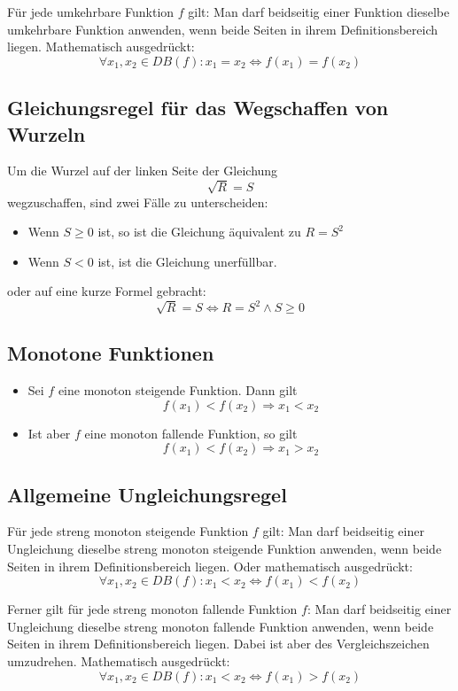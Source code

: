 \documentclass[10pt,a4paper]{article}
\begin{document}
Für jede umkehrbare Funktion $f$ gilt: Man darf beidseitig einer Funktion dieselbe umkehrbare Funktion anwenden, wenn beide Seiten in ihrem Definitionsbereich liegen. Mathematisch ausgedrückt:
$$\forall x_1, x_2 \in DB(f): x_1 = x_2 \Leftrightarrow f(x_1) = f(x_2)$$


\subsection{Gleichungsregel für das Wegschaffen von Wurzeln}

Um die Wurzel auf der linken Seite der Gleichung
$$\sqrt{R} = S$$
wegzuschaffen, sind zwei Fälle zu unterscheiden:

\begin{itemize}
\item Wenn $S \geq 0$ ist, so ist die Gleichung äquivalent zu $R = S^2$
\item Wenn $S < 0$ ist, ist die Gleichung unerfüllbar.
\end{itemize}

oder auf eine kurze Formel gebracht:
$$\sqrt{R} = S \Leftrightarrow R = S^2 \wedge S \geq 0$$


\subsection{Monotone Funktionen}

\begin{itemize}
	\item Sei $f$ eine monoton steigende Funktion. Dann gilt
	$$f(x_1) < f(x_2) \Rightarrow x_1 < x_2$$

	\item Ist aber $f$ eine monoton fallende Funktion, so gilt
	$$f(x_1) < f(x_2) \Rightarrow x_1 > x_2$$
\end{itemize}


\subsection{Allgemeine Ungleichungsregel}

Für jede streng monoton steigende Funktion $f$ gilt: Man darf beidseitig einer Ungleichung dieselbe streng monoton steigende Funktion anwenden, wenn beide Seiten in ihrem Definitionsbereich liegen. Oder mathematisch ausgedrückt:
$$\forall x_1, x_2 \in DB(f): x_1 < x_2 \Leftrightarrow f(x_1) < f(x_2)$$

Ferner gilt für jede streng monoton fallende Funktion $f$: Man darf beidseitig einer Ungleichung dieselbe streng monoton fallende Funktion anwenden, wenn beide Seiten in ihrem Definitionsbereich liegen. Dabei ist aber des Vergleichszeichen umzudrehen. Mathematisch ausgedrückt:
$$\forall x_1, x_2 \in DB(f): x_1 < x_2 \Leftrightarrow f(x_1) > f(x_2)$$
\end{document}
